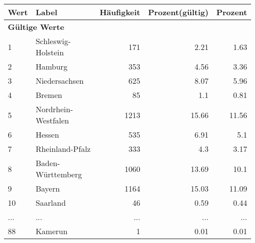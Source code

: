      \begin{longtable}{lXrrr}
     \toprule
     \textbf{Wert} & \textbf{Label} & \textbf{Häufigkeit} & \textbf{Prozent(gültig)} & \textbf{Prozent} \\
     \endhead
     \midrule
     \multicolumn{5}{l}{\textbf{Gültige Werte}}\\
        1 & \multicolumn{1}{X}{Schleswig-Holstein} & %
          \num{171} &
          \num[round-mode=places,round-precision=2]{2.21} &
          \num[round-mode=places,round-precision=2]{1.63} \\
        2 & \multicolumn{1}{X}{Hamburg} & %
          \num{353} &
          \num[round-mode=places,round-precision=2]{4.56} &
          \num[round-mode=places,round-precision=2]{3.36} \\
        3 & \multicolumn{1}{X}{Niedersachsen} & %
          \num{625} &
          \num[round-mode=places,round-precision=2]{8.07} &
          \num[round-mode=places,round-precision=2]{5.96} \\
        4 & \multicolumn{1}{X}{Bremen} & %
          \num{85} &
          \num[round-mode=places,round-precision=2]{1.1} &
          \num[round-mode=places,round-precision=2]{0.81} \\
        5 & \multicolumn{1}{X}{Nordrhein-Westfalen} & %
          \num{1213} &
          \num[round-mode=places,round-precision=2]{15.66} &
          \num[round-mode=places,round-precision=2]{11.56} \\
        6 & \multicolumn{1}{X}{Hessen} & %
          \num{535} &
          \num[round-mode=places,round-precision=2]{6.91} &
          \num[round-mode=places,round-precision=2]{5.1} \\
        7 & \multicolumn{1}{X}{Rheinland-Pfalz} & %
          \num{333} &
          \num[round-mode=places,round-precision=2]{4.3} &
          \num[round-mode=places,round-precision=2]{3.17} \\
        8 & \multicolumn{1}{X}{Baden-Württemberg} & %
          \num{1060} &
          \num[round-mode=places,round-precision=2]{13.69} &
          \num[round-mode=places,round-precision=2]{10.1} \\
        9 & \multicolumn{1}{X}{Bayern} & %
          \num{1164} &
          \num[round-mode=places,round-precision=2]{15.03} &
          \num[round-mode=places,round-precision=2]{11.09} \\
        10 & \multicolumn{1}{X}{Saarland} & %
          \num{46} &
          \num[round-mode=places,round-precision=2]{0.59} &
          \num[round-mode=places,round-precision=2]{0.44} \\
       ... & ... & ... & ... & ... \\
        88 & \multicolumn{1}{X}{Kamerun} & %
          \num{1} &
          \num[round-mode=places,round-precision=2]{0.01} &
          \num[round-mode=places,round-precision=2]{0.01} \\


\end{longtable}
